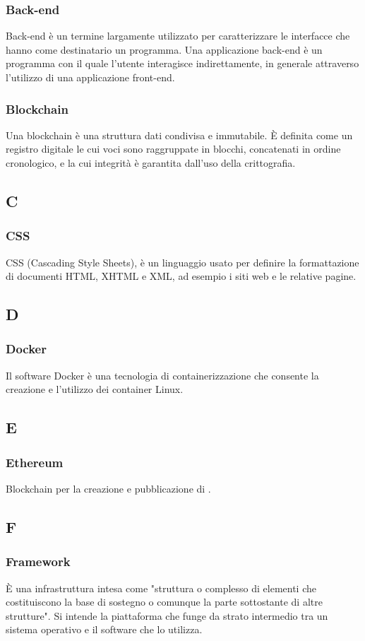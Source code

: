 \subsubsection*{Back-end} Back-end è un termine largamente utilizzato per caratterizzare le interfacce che hanno come destinatario un programma. Una applicazione back-end è un programma con il quale l'utente interagisce indirettamente, in generale attraverso l'utilizzo di una applicazione front-end.
\subsubsection*{Blockchain} Una blockchain è una struttura dati condivisa e immutabile. È definita come un registro
digitale le cui voci sono raggruppate in blocchi, concatenati in ordine cronologico, e la cui integrità è garantita dall'uso della crittografia.
\subsection*{C}
\subsubsection*{CSS} CSS (Cascading Style Sheets), è un linguaggio usato per definire la formattazione di documenti HTML, XHTML e XML, ad esempio i siti web e le relative pagine.
\subsection*{D}
\subsubsection*{Docker} Il software Docker è una tecnologia di containerizzazione che consente la creazione e l’utilizzo dei container Linux.
\subsection*{E}
\subsubsection*{Ethereum} Blockchain per la creazione e pubblicazione di .
\subsection*{F}
\subsubsection*{Framework} È una infrastruttura intesa come "struttura o complesso di elementi che costituiscono la base di sostegno o comunque la parte sottostante di altre strutture". Si intende la piattaforma che funge da strato intermedio tra un sistema operativo e il software che lo utilizza.
